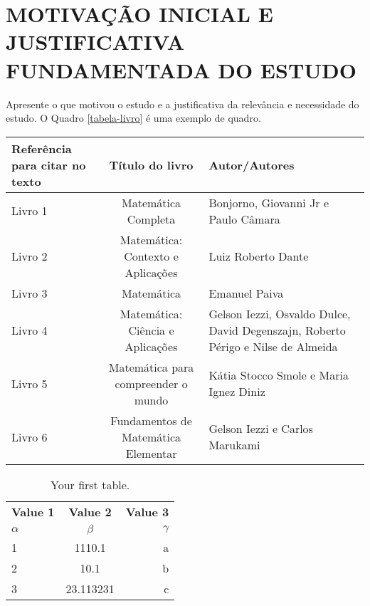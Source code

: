 \chapter{MOTIVAÇÃO INICIAL E JUSTIFICATIVA FUNDAMENTADA DO ESTUDO}
\label{cap1}
\thispagestyle{empty}

Apresente o que motivou o estudo e a justificativa da relevância e necessidade do estudo. O Quadro \ref{tabela-livro} é uma exemplo de quadro.

  \begin{tabular}{|p{3cm}||c||p{4cm}|}
      \hline
      \textbf{Referência para citar no texto}    & \textbf {Título do livro} & \textbf {Autor/Autores} \\
  \hline
  \hline
  \label{livro 1}Livro 1 & Matemática Completa&Bonjorno, Giovanni Jr e Paulo Câmara \\ 
  \hline
 \label{livro 2}Livro 2 & Matemática: Contexto e Aplicações & Luiz Roberto Dante\\ 
 \hline
 \label{livro 3}Livro 3 & Matemática & Emanuel Paiva \\ 
 \hline
  \label{livro 4}Livro 4 & Matemática: Ciência e Aplicações  &Gelson Iezzi, Osvaldo Dulce, David Degenszajn, Roberto Périgo e Nilse de Almeida \\ 
  \hline
  \label{livro 5}Livro 5 & Matemática para compreender o mundo & Kátia Stocco Smole e Maria Ignez Diniz \\ 
 
 \hline
  \label{livro 6}Livro 6 & Fundamentos de Matemática Elementar & Gelson Iezzi e Carlos Marukami \\ 
 \hline

 \end{tabular}
\vspace{0.5cm}

\begin{table}[h!]
  \begin{center}
    \caption{Your first table.}
    \label{tab:table1}
    \begin{tabular}{l|c|r} %
      \textbf{Value 1} & \textbf{Value 2} & \textbf{Value 3}\\
      $\alpha$ & $\beta$ & $\gamma$ \\
      \hline
      1 & 1110.1 & a\\
      2 & 10.1 & b\\
      3 & 23.113231 & c\\
    \end{tabular}
  \end{center}
\end{table}



